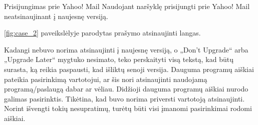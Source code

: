 ﻿\begin{xcase}{Prisijungimas prie Yahoo! Mail}
  \xcgoal
  {
    Naudojant naršyklę prisijungti prie Yahoo! Mail neatsinaujinant į naujesnę versiją.
  }
  \xctools
  {
    \ref{fig:case_2} paveikslėlyje parodytas prašymo atsinaujinti langas.

  }
  \xcresult
  {
    Kadangi nebuvo norima atsinaujinti į naujesnę versiją, o „Don't Upgrade“ arba „Upgrade Later“ 
    mygtuko nesimato, teko perskaityti visą tekstą, kad būtų surasta, ką reikia paspausti, kad 
    išliktų senoji versija.
  }
  \xcprinciples
  {
    {
      Dauguma programų aiškiai pateikia pasirinkimą vartotojui, ar šis nori atsinaujinti
      naudojamą programą/paslaugą dabar ar vėliau.
    }
    {
      Didžioji dauguma programų aiškiai nurodo galimas pasirinktis.
    }
  }
  \xcthoughts
  {
    Tikėtina, kad buvo norima priversti vartotoją atsinaujinti. Norint išvengti 
    tokių nesupratimų, turėtų būti visi įmanomi pasirinkimai rodomi aiškiai.
  }
\end{xcase}
